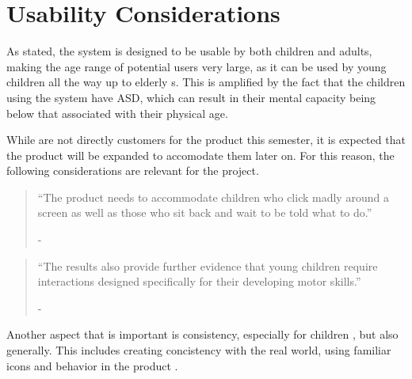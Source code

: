 \section{Usability Considerations}
\label{Preanalysis:Usability_for_children}
As stated, the \giraf[] system is designed to be usable by both children and adults, making the age range of potential users very large, as it can be used by young children all the way up to elderly \guardian[]s. 
This is amplified by the fact that the children using the system have ASD, which can result in their mental capacity being below that associated with their physical age. 

While \autists[] are not directly customers for the product this semester, it is expected that the product will be expanded to accomodate them later on. 
For this reason, the following considerations are relevant for the project.

\begin{quotation}
``The product needs to accommodate children who click madly around a screen as well as those who sit back and wait to be told what to do.''\\ 
 \begin{flushright}
  - \citep{microsoft:usability}
 \end{flushright}
\end{quotation}

\begin{quotation}
``The results also provide further evidence that young children require interactions designed specifically for their developing motor skills.''\\ 
 \begin{flushright}
  - \citep[p. 8]{mousesize}
 \end{flushright}
\end{quotation}

Another aspect that is important is consistency, especially for children \citep{microsoft:usability}, but also generally. \citep[p. 90]{dieb-book} 
This includes creating concistency with the real world, using familiar icons and behavior in the product \citep{microsoft:usability}. 
